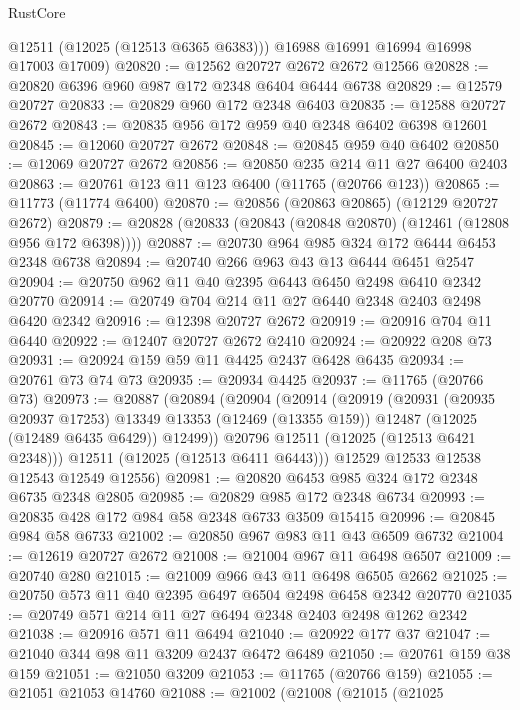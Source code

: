 \begin{lexlean}{RustCore}
\begin{coremodule}
        @12511
        (@12025 (@12513 @6365 @6383)))
      @16988
      @16991
      @16994
      @16998
      @17003
      @17009)
@20820 := @12562 @20727 @2672 @2672 @12566
@20828 := @20820 @6396 @960 @987 @172 @2348 @6404 @6444 @6738
@20829 := @12579 @20727
@20833 := @20829 @960 @172 @2348 @6403
@20835 := @12588 @20727 @2672
@20843 := @20835 @956 @172 @959 @40 @2348 @6402 @6398 @12601
@20845 := @12060 @20727 @2672
@20848 := @20845 @959 @40 @6402
@20850 := @12069 @20727 @2672
@20856 := @20850 @235 @214 @11 @27 @6400 @2403
@20863 := @20761 @123 @11 @123 @6400 (@11765 (@20766 @123))
@20865 := @11773 (@11774 @6400)
@20870 := @20856 (@20863 @20865) (@12129 @20727 @2672)
@20879 := @20828 (@20833 (@20843 (@20848 @20870) (@12461 (@12808 @956 @172 @6398))))
@20887 := @20730 @964 @985 @324 @172 @6444 @6453 @2348 @6738
@20894 := @20740 @266 @963 @43 @13 @6444 @6451 @2547
@20904 := @20750 @962 @11 @40 @2395 @6443 @6450 @2498 @6410 @2342 @20770
@20914 := @20749 @704 @214 @11 @27 @6440 @2348 @2403 @2498 @6420 @2342
@20916 := @12398 @20727 @2672
@20919 := @20916 @704 @11 @6440
@20922 := @12407 @20727 @2672 @2410
@20924 := @20922 @208 @73
@20931 := @20924 @159 @59 @11 @4425 @2437 @6428 @6435
@20934 := @20761 @73 @74 @73
@20935 := @20934 @4425
@20937 := @11765 (@20766 @73)
@20973 := @20887
    (@20894
      (@20904
        (@20914
          (@20919
            (@20931
              (@20935 @20937 @17253)
              @13349
              @13353
              (@12469 (@13355 @159))
              @12487
              (@12025 (@12489 @6435 @6429))
              @12499))
          @20796
          @12511
          (@12025 (@12513 @6421 @2348)))
        @12511
        (@12025 (@12513 @6411 @6443)))
      @12529
      @12533
      @12538
      @12543
      @12549
      @12556)
@20981 := @20820 @6453 @985 @324 @172 @2348 @6735 @2348 @2805
@20985 := @20829 @985 @172 @2348 @6734
@20993 := @20835 @428 @172 @984 @58 @2348 @6733 @3509 @15415
@20996 := @20845 @984 @58 @6733
@21002 := @20850 @967 @983 @11 @43 @6509 @6732
@21004 := @12619 @20727 @2672
@21008 := @21004 @967 @11 @6498 @6507
@21009 := @20740 @280
@21015 := @21009 @966 @43 @11 @6498 @6505 @2662
@21025 := @20750 @573 @11 @40 @2395 @6497 @6504 @2498 @6458 @2342 @20770
@21035 := @20749 @571 @214 @11 @27 @6494 @2348 @2403 @2498 @1262 @2342
@21038 := @20916 @571 @11 @6494
@21040 := @20922 @177 @37
@21047 := @21040 @344 @98 @11 @3209 @2437 @6472 @6489
@21050 := @20761 @159 @38 @159
@21051 := @21050 @3209
@21053 := @11765 (@20766 @159)
@21055 := @21051 @21053 @14760
@21088 := @21002
    (@21008
      (@21015
        (@21025

\end{coremodule}
\end{lexlean}
